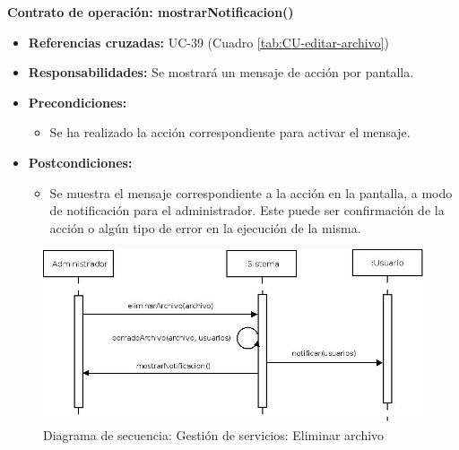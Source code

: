 \textbf{Contrato de operación: mostrarNotificacion()}
\begin{itemize}
\item \textbf{Referencias cruzadas:} UC-39 (Cuadro \ref{tab:CU-editar-archivo})
\item \textbf{Responsabilidades:} Se mostrará un mensaje de acción por pantalla.
\item \textbf{Precondiciones:} 
 \begin{itemize}
\item Se ha realizado la acción correspondiente para activar el mensaje.
\end {itemize}
\item \textbf{Postcondiciones:} 
 \begin{itemize}
\item Se muestra el mensaje correspondiente a la acción en la pantalla, a modo de notificación para el administrador. Este puede ser confirmación de la acción o algún tipo de error en la ejecución de la misma.
\end {itemize}
\end {itemize}


\vspace{7mm}
\dotfill
\vspace{7mm}

\begin{figure}[h!]
\centering
  \includegraphics[scale=.50]{img/secuencias/gestion-servicios-eliminar-archivo.jpeg}
  \caption{Diagrama de secuencia: Gestión de servicios: Eliminar archivo}
  \label{fig:secuencia-gestion-servicios-eliminar-archivo}
\end{figure}

